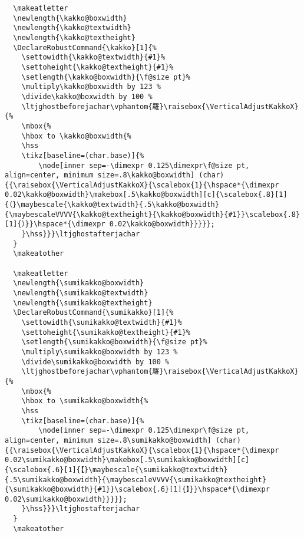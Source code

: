 \documentclass[luatex,fontsize=10pt,paper=b5,twoside]{jlreq}%
\begin{document}
\begin{lstlisting}
  \makeatletter
  \newlength{\kakko@boxwidth}
  \newlength{\kakko@textwidth}
  \newlength{\kakko@textheight}
  \DeclareRobustCommand{\kakko}[1]{%
    \settowidth{\kakko@textwidth}{#1}%
    \settoheight{\kakko@textheight}{#1}%
    \setlength{\kakko@boxwidth}{\f@size pt}%
    \multiply\kakko@boxwidth by 123 %
    \divide\kakko@boxwidth by 100 %
    \ltjghostbeforejachar\vphantom{羅}\raisebox{\VerticalAdjustKakkoX}{%
    \mbox{%
    \hbox to \kakko@boxwidth{%
    \hss
    \tikz[baseline=(char.base)]{%
        \node[inner sep=-\dimexpr 0.125\dimexpr\f@size pt, align=center, minimum size=.8\kakko@boxwidth] (char) {{\raisebox{\VerticalAdjustKakkoX}{\scalebox{1}{\hspace*{\dimexpr 0.02\kakko@boxwidth}\makebox[.5\kakko@boxwidth][c]{\scalebox{.8}[1]{（}\maybescale{\kakko@textwidth}{.5\kakko@boxwidth}{\maybescaleVVVV{\kakko@textheight}{\kakko@boxwidth}{#1}}\scalebox{.8}[1]{）}}\hspace*{\dimexpr 0.02\kakko@boxwidth}}}}};
    }\hss}}}\ltjghostafterjachar
  }
  \makeatother

  \makeatletter
  \newlength{\sumikakko@boxwidth}
  \newlength{\sumikakko@textwidth}
  \newlength{\sumikakko@textheight}
  \DeclareRobustCommand{\sumikakko}[1]{%
    \settowidth{\sumikakko@textwidth}{#1}%
    \settoheight{\sumikakko@textheight}{#1}%
    \setlength{\sumikakko@boxwidth}{\f@size pt}%
    \multiply\sumikakko@boxwidth by 123 %
    \divide\sumikakko@boxwidth by 100 %
    \ltjghostbeforejachar\vphantom{羅}\raisebox{\VerticalAdjustKakkoX}{%
    \mbox{%
    \hbox to \sumikakko@boxwidth{%
    \hss
    \tikz[baseline=(char.base)]{%
        \node[inner sep=-\dimexpr 0.125\dimexpr\f@size pt, align=center, minimum size=.8\sumikakko@boxwidth] (char) {{\raisebox{\VerticalAdjustKakkoX}{\scalebox{1}{\hspace*{\dimexpr 0.02\sumikakko@boxwidth}\makebox[.5\sumikakko@boxwidth][c]{\scalebox{.6}[1]{【}\maybescale{\sumikakko@textwidth}{.5\sumikakko@boxwidth}{\maybescaleVVVV{\sumikakko@textheight}{\sumikakko@boxwidth}{#1}}\scalebox{.6}[1]{】}}\hspace*{\dimexpr 0.02\sumikakko@boxwidth}}}}};
    }\hss}}}\ltjghostafterjachar
  }
  \makeatother


\end{lstlisting}
\end{document}
